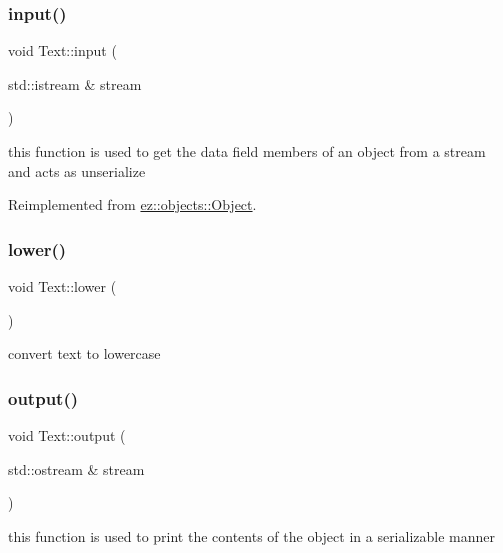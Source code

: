 \subsubsection{\texorpdfstring{input()}{input()}}
{\footnotesize\ttfamily void Text\+::input (\begin{DoxyParamCaption}\item[{std\+::istream \&}]{stream }\end{DoxyParamCaption})\hspace{0.3cm}{\ttfamily [virtual]}}

this function is used to get the data field members of an object from a stream and acts as unserialize 

Reimplemented from \hyperlink{classez_1_1objects_1_1Object_a878bdc53b7f16fda6fa15dab214c4b6a}{ez\+::objects\+::\+Object}.

\mbox{\label{classez_1_1objects_1_1Text_a0daced300441edc38c7ec5d4dae02a3e}} 
\subsubsection{\texorpdfstring{lower()}{lower()}}
{\footnotesize\ttfamily void Text\+::lower (\begin{DoxyParamCaption}{ }\end{DoxyParamCaption})}

convert text to lowercase \mbox{\label{classez_1_1objects_1_1Text_a7d35b931601e4fb476cd168744bc03d6}} 
\subsubsection{\texorpdfstring{output()}{output()}}
{\footnotesize\ttfamily void Text\+::output (\begin{DoxyParamCaption}\item[{std\+::ostream \&}]{stream }\end{DoxyParamCaption})\hspace{0.3cm}{\ttfamily [virtual]}}

this function is used to print the contents of the object in a serializable manner 

